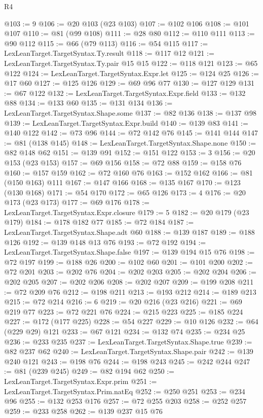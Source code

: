 \begin{lexlean}{R4}
\begin{coremodule}
{{{{{{{{{{{{{{{{{{{{{{{{{{{{{@103 := 9
@106 := @20 @103 (@23 @103)
@107 := @102 @106
@108 := @101 @107
@110 := @81 (@99 @108)
@111 := @28 @80
@112 := @110 @111
@113 := @90 @112
@115 := @66 (@79 @113)
@116 := @54 @115
@117 := LexLeanTarget.TargetSyntax.Ty.result
@118 := @117 @12
@121 := LexLeanTarget.TargetSyntax.Ty.pair @15 @15
@122 := @118 @121
@123 := @65 @122
@124 := LexLeanTarget.TargetSyntax.Expr.let
@125 := @124 @25
@126 := @17 @60
@127 := @125 @126
@129 := @69 @96 @77
@130 := @127 @129
@131 := @67 @122
@132 := LexLeanTarget.TargetSyntax.Expr.field
@133 := @132 @88
@134 := @133 @60
@135 := @131 @134
@136 := LexLeanTarget.TargetSyntax.Shape.some
@137 := @82 @136
@138 := @137 @98
@139 := LexLeanTarget.TargetSyntax.Expr.build
@140 := @139 @83
@141 := @140 @122
@142 := @73 @96
@144 := @72 @142 @76
@145 := @141 @144
@147 := @81 (@138 @145)
@148 := LexLeanTarget.TargetSyntax.Shape.none
@150 := @82 @148 @62
@151 := @139 @91
@152 := @151 @122
@153 := 3
@156 := @20 @153 (@23 @153)
@157 := @69 @156
@158 := @72 @88
@159 := @158 @76
@160 := @157 @159
@162 := @72 @160 @76
@163 := @152 @162
@166 := @81 (@150 @163) @111
@167 := @147 @166
@168 := @135 @167
@170 := @123 (@130 @168)
@171 := @54 @170
@172 := @65 @126
@173 := 4
@176 := @20 @173 (@23 @173)
@177 := @69 @176
@178 := LexLeanTarget.TargetSyntax.Expr.closure
@179 := 5
@182 := @20 @179 (@23 @179)
@184 := @178 @182 @77
@185 := @72 @184
@187 := LexLeanTarget.TargetSyntax.Shape.adt @60
@188 := @139 @187
@189 := @188 @126
@192 := @139 @148 @13 @76
@193 := @72 @192
@194 := LexLeanTarget.TargetSyntax.Shape.false
@197 := @139 @194 @15 @76
@198 := @72 @197
@199 := @188 @26
@200 := @102 @60
@201 := @101 @200
@202 := @72 @201
@203 := @202 @76
@204 := @202 @203
@205 := @202 @204
@206 := @202 @205
@207 := @202 @206
@208 := @202 @207
@209 := @199 @208
@211 := @72 @209 @76
@212 := @198 @211
@213 := @193 @212
@214 := @189 @213
@215 := @72 @214
@216 := 6
@219 := @20 @216 (@23 @216)
@221 := @69 @219 @77
@223 := @72 @221 @76
@224 := @215 @223
@225 := @185 @224
@227 := @172 (@177 @225)
@228 := @54 @227
@229 := @10 @126
@232 := @64 (@229 @29) @121
@233 := @67 @121
@234 := @132 @74
@235 := @234 @25
@236 := @233 @235
@237 := LexLeanTarget.TargetSyntax.Shape.true
@239 := @82 @237 @62
@240 := LexLeanTarget.TargetSyntax.Shape.pair
@242 := @139 @240 @121
@243 := @198 @76
@244 := @198 @243
@245 := @242 @244
@247 := @81 (@239 @245)
@249 := @82 @194 @62
@250 := LexLeanTarget.TargetSyntax.Expr.prim
@251 := LexLeanTarget.TargetSyntax.Prim.natEq
@252 := @250 @251
@253 := @234 @96
@255 := @132 @253 @176
@257 := @72 @255 @203
@258 := @252 @257
@259 := @233 @258
@262 := @139 @237 @15 @76
}}}}}}}}}}}}}}}}}}}}}}}}}}}}}
\end{coremodule}
\end{lexlean}
